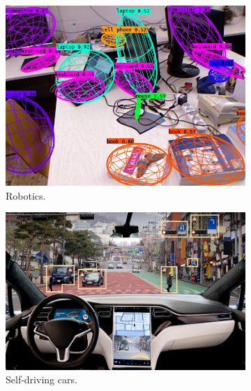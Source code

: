 \begin{figure}[h]
 \centering
     \begin{subfigure}[b]{0.3\textwidth}
         \centering
         \includegraphics[width=\textwidth]{Figures/Introduction/app1.png}
         \caption{Robotics.}
         \label{fig:app1}
     \end{subfigure}
     \hfill
     \begin{subfigure}[b]{0.35\textwidth}
         \centering
         \includegraphics[width=\textwidth]{Figures/Introduction/app2.jpg}
         \caption{Self-driving cars.}
         \label{fig:app2}
     \end{subfigure}
     \hfill
     \begin{subfigure}[b]{0.3\textwidth}
         \centering

\end{subfigure}
\end{figure}
